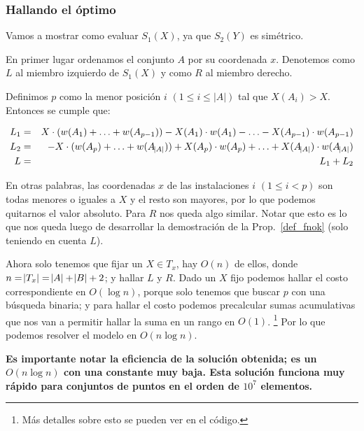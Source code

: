 \subsubsection{Hallando el óptimo}

Vamos a mostrar como evaluar $S_1(X)$, ya que $S_2(Y)$ es simétrico.

En primer lugar ordenamos el conjunto $A$ por su coordenada $x$. Denotemos como $L$ al miembro izquierdo de $S_1(X)$ y como $R$ al miembro derecho.

Definimos $p$ como la menor posición $i$ $(1 \le i \le |A|)$ tal que $X(A_i) > X$. Entonces se cumple que:

\begin{eqnarray*}
    L_1 &=& X \cdot (w(A_1) + \ldots + w(A_{p-1})) - X(A_1) \cdot w(A_1) - \ldots - X(A_{p-1}) \cdot w(A_{p-1}) \\
    L_2 &=& -X \cdot (w(A_p) + \ldots + w(A_{\abs{A}})) + X(A_p) \cdot w(A_p) + \ldots + X(A_{\abs{A}}) \cdot w(A_{\abs{A}}) \\
    L &=& L_1 + L_2
\end{eqnarray*}

En otras palabras, las coordenadas $x$ de las instalaciones $i$ $(1 \le i < p)$ son todas menores o iguales a $X$ y el resto son mayores, por lo que podemos quitarnos el valor absoluto. Para $R$ nos queda algo similar. Notar que esto es lo que nos queda luego de desarrollar la demostración de la Prop.~\ref{def_fnok} (solo teniendo en cuenta $L$).

Ahora solo tenemos que fijar un $X \in T_x$, hay $O(n)$ de ellos, donde $n = \abs{T_x} = \abs{A} + \abs{B} + 2$; y hallar $L$ y $R$. Dado un $X$ fijo podemos hallar el costo correspondiente en $O(\log n )$, porque solo tenemos que buscar $p$ con una búsqueda binaria; y para hallar el costo podemos precalcular sumas acumulativas que nos van a permitir hallar la suma en un rango en $O(1)$. \footnote{Más detalles sobre esto se pueden ver en el código.} Por lo que podemos resolver el modelo en $O(n \log n)$.

\textbf{Es importante notar la eficiencia de la solución obtenida; es un $O(n \log n)$ con una constante muy baja. Esta solución funciona muy rápido para conjuntos de puntos en el orden de $10^7$ elementos.}